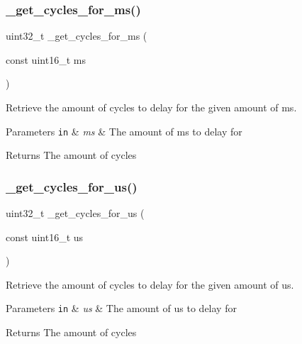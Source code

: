 \subsubsection{\texorpdfstring{\+\_\+get\+\_\+cycles\+\_\+for\+\_\+ms()}{\_get\_cycles\_for\_ms()}}
{\footnotesize\ttfamily uint32\+\_\+t \+\_\+get\+\_\+cycles\+\_\+for\+\_\+ms (\begin{DoxyParamCaption}\item[{const uint16\+\_\+t}]{ms }\end{DoxyParamCaption})}



Retrieve the amount of cycles to delay for the given amount of ms. 


\begin{DoxyParams}[1]{Parameters}
\mbox{\tt in}  & {\em ms} & The amount of ms to delay for\\
\hline
\end{DoxyParams}
\begin{DoxyReturn}{Returns}
The amount of cycles 
\end{DoxyReturn}
\mbox{\label{group___h_p_l_gacdb903e26206a1b890c9465e20455aef}} 
\subsubsection{\texorpdfstring{\+\_\+get\+\_\+cycles\+\_\+for\+\_\+us()}{\_get\_cycles\_for\_us()}}
{\footnotesize\ttfamily uint32\+\_\+t \+\_\+get\+\_\+cycles\+\_\+for\+\_\+us (\begin{DoxyParamCaption}\item[{const uint16\+\_\+t}]{us }\end{DoxyParamCaption})}



Retrieve the amount of cycles to delay for the given amount of us. 


\begin{DoxyParams}[1]{Parameters}
\mbox{\tt in}  & {\em us} & The amount of us to delay for\\
\hline
\end{DoxyParams}
\begin{DoxyReturn}{Returns}
The amount of cycles 
\end{DoxyReturn}
\mbox{\label{group___h_p_l_gab7e1d30a2aa0a64c175ce3ce373b3c4f}} 
